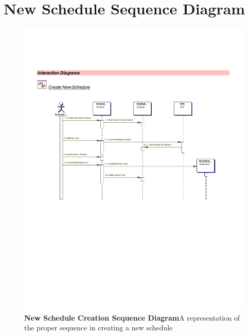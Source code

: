 \documentclass[letterpaper,12pt]{report}
\begin{document}
\section{New Schedule Sequence Diagram}
\begin{figure}[hbp]
 \includegraphics[trim=20mm 80mm 25mm 45mm]{diagrams/seq1.pdf}
 \caption{\small
\textbf{New Schedule Creation Sequence Diagram}\newline A representation of the proper sequence in creating a new schedule}\label{fig:seq1}
\end{figure}
\newpage
\end{document}
